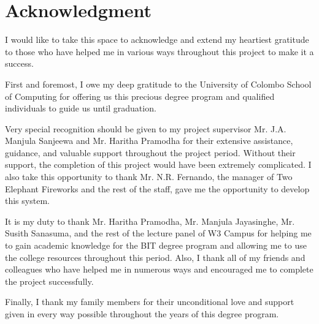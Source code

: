 \documentclass[12pt]{report}
\begin{document}
\newpage
\thispagestyle{plain}
\chapter*{\Huge Acknowledgment}
I would like to take this space to acknowledge and extend my heartiest gratitude to those who have helped me in various ways throughout this project to make it a success.

First and foremost, I owe my deep gratitude to the University of Colombo School of Computing for offering us this precious degree program and qualified individuals to guide us until graduation.

Very special recognition should be given to my project supervisor Mr. J.A. Manjula Sanjeewa and Mr. Haritha Pramodha for their extensive assistance, guidance, and valuable support throughout the project period. Without their support, the completion of this project would have been extremely complicated. I also take this opportunity to thank Mr. N.R. Fernando, the manager of Two Elephant Fireworks and the rest of the staff, gave me the opportunity to develop this system.

It is my duty to thank Mr. Haritha Pramodha, Mr. Manjula Jayasinghe, Mr. Susith Sanasuma, and the rest of the lecture panel of W3 Campus for helping me to gain academic knowledge for the BIT degree program and allowing me to use the college resources throughout this period. Also, I thank all of my friends and colleagues who have helped me in numerous ways and encouraged me to complete the project successfully.

Finally, I thank my family members for their unconditional love and support given in every way possible throughout the years of this degree program.


\newpage
{}
\begin{singlespacing}
	\tableofcontents
\end{singlespacing}
\setlength{\parskip}{1em}
\renewcommand{\baselinestretch}{2.0}


\newpage
{}
\begin{singlespacing}
	\listoffigures
\end{singlespacing}
\renewcommand{\baselinestretch}{2.0}


\newpage
{}
\begin{singlespacing}
	\listoftables
\end{singlespacing}
\renewcommand{\baselinestretch}{2.0}
\end{document}
